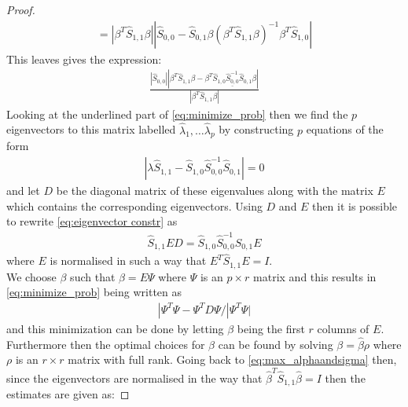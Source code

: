 \begin{proof}
\begin{align*}
         =|\beta^T \hat{S}_{1,1}\beta||\hat{S}_{0,0}-\hat{S}_{0,1}\beta(\beta^T \hat{S}_{1,1}\beta)^{-1}\beta^T\hat{S}_{1,0}|
 \end{align*}
 This leaves gives the expression:
 \begin{align}\label{eq:minimize_prob}
     \frac{|\hat{S}_{0,0}||\beta^T\hat{S}_{1,1}\beta-\beta^T\underline{\hat{S}_{1,0}\hat{S}^{-1}_{0,0}\hat{S}_{0,1}}\beta|}
     {|\beta^T \hat{S}_{1,1}\beta|}
 \end{align}
 Looking at the underlined part of \eqref{eq:minimize_prob} then we find the $p$ eigenvectors to this matrix labelled $\hat{\lambda}_1,\ldots\hat{\lambda}_p$ by constructing $p$ equations of the form
 \begin{align}\label{eq:eigenvector constr}
     |\lambda \hat{S}_{1,1}-\hat{S}_{1,0}\hat{S}^{-1}_{0,0}\hat{S}_{0,1}|=0
 \end{align}
and let $D$ be the diagonal matrix of these eigenvalues along with the matrix $E$ which contains the corresponding eigenvectors. Using $D$ and $E$ then it is possible to rewrite \eqref{eq:eigenvector constr} as
\begin{align*}
    \hat{S}_{1,1}ED=\hat{S}_{1,0}\hat{S}^{-1}_{0,0}\hat{S}_{0,1}E
\end{align*}
where $E$ is normalised in such a way that $E^T\hat{S}_{1,1}E=I$.\\
We choose $\beta$ such that $\beta=E\Psi$ where $\Psi$ is an $p\times r$ matrix and this results in \eqref{eq:minimize_prob} being written as
\begin{align*}
    |\Psi^T\Psi-\Psi^T D\Psi/|\Psi^T\Psi|
\end{align*}
and this minimization can be done by letting $\beta$ being the first $r$ columns of $E$. Furthermore then the optimal choices for $\beta$ can be found by solving $\beta=\hat{\beta}\rho$ where $\rho$ is an $r\times r$ matrix with full rank.
Going back to \eqref{eq:max_alphaandsigma} then, since the eigenvectors are normalised in the way that $\hat{\beta}^T \hat{S}_{1,1}\hat{\beta}=I$ then the estimates are given as:


\end{proof}
